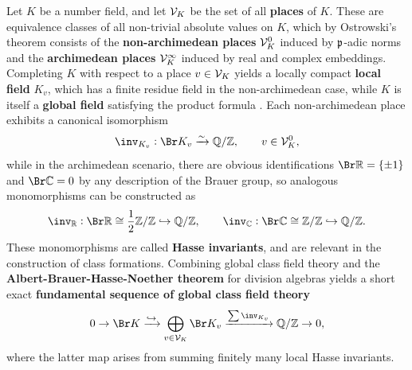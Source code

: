 Let $ K $ be a number field, and let $ \mathcal{V}_K $ be the set of all \textbf{places} of $ K $. These are equivalence classes of all non-trivial absolute values on $ K $, which by Ostrowski's theorem consists of the \textbf{non-archimedean places} $ \mathcal{V}_K^0 $ induced by $ \mathfrak{p} $-adic norms and the \textbf{archimedean places} $ \mathcal{V}_K^\infty $ induced by real and complex embeddings. Completing $ K $ with respect to a place $ v \in \mathcal{V}_K $ yields a locally compact \textbf{local field} $ K_v $, which has a finite residue field in the non-archimedean case, while $ K $ is itself a \textbf{global field} satisfying the product formula \cite[Section II.1]{Ser80}. Each non-archimedean place exhibits a canonical isomorphism \cite[Theorem III.2.1]{Mil13}
$$ \inv_{K_v} : \Br K_v \xrightarrow{\sim} \QQ / \ZZ, \qquad v \in \VVV_K^0, $$
while in the archimedean scenario, there are obvious identifications $ \Br \RR = \cbr{\pm 1} $ and $ \Br \CC = 0 $ by any description of the Brauer group, so analogous monomorphisms can be constructed as
$$ \inv_\RR : \Br \RR \cong \dfrac{1}{2}\ZZ / \ZZ \hookrightarrow \QQ / \ZZ, \qquad \inv_\CC : \Br \CC \cong \ZZ / \ZZ \hookrightarrow \QQ / \ZZ. $$
These monomorphisms are called \textbf{Hasse invariants}, and are relevant in the construction of class formations. Combining global class field theory and the \textbf{Albert-Brauer-Hasse-Noether theorem} for division algebras yields a short exact \textbf{fundamental sequence of global class field theory} \cite[Theorem VIII.4.2]{Mil13}
$$ 0 \to \Br K \xrightarrow{\hookrightarrow} \bigoplus_{v \in \VVV_K} \Br K_v \xrightarrow{\sum \inv_{K_v}} \QQ / \ZZ \to 0, $$
where the latter map arises from summing finitely many local Hasse invariants.

